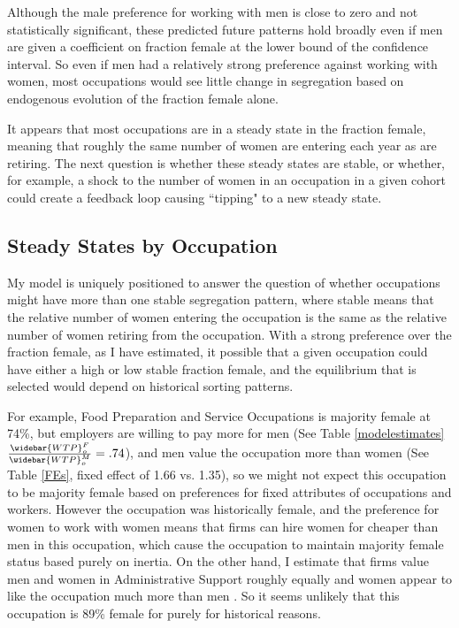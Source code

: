 \documentclass[12pt]{article}
\begin{document}
Although the male preference for working with men is close to zero and not statistically significant, these predicted future patterns hold broadly even if men are given a coefficient on fraction female at the lower bound of the confidence interval. So even if men had a relatively strong preference against working with women, most occupations would see little change in segregation based on endogenous evolution of the fraction female alone.

It appears that most occupations are in a steady state in the fraction female, meaning that roughly the same number of women are entering each year as are retiring. The next question is whether these steady states are stable, or whether, for example, a shock to the number of women in an occupation in a given cohort could create a feedback loop causing ``tipping" to a new steady state.  


\subsection{Steady States by Occupation}
My model is uniquely positioned to answer the question of whether occupations might have more than one stable segregation pattern, where stable means that the relative number of women entering the occupation is the same as the relative number of women retiring from the occupation. With a strong preference over the fraction female, as I have estimated, it possible that a given occupation could have either a high or low stable fraction female, and the equilibrium that is selected would depend on historical sorting patterns. 

For example, Food Preparation and Service Occupations is majority female at 74\%, but employers are willing to pay more for men (See Table \ref{modelestimates} $ \frac{\widebar{WTP}^F_o}{\widebar{WTP}^M_o} = .74$), and men value the occupation more than women (See Table \ref{FEs}, fixed effect of 1.66 vs. 1.35), so we might not expect this occupation to be majority female based on preferences for fixed attributes of occupations and workers. However the occupation was historically female, and the preference for women to work with women means that firms can hire women for cheaper than men in this occupation, which cause the occupation to maintain majority female status based purely on inertia. On the other hand, I estimate that firms value men and women in Administrative Support roughly equally  and women appear to like the occupation much more than men . So it seems unlikely that this occupation is 89\% female for purely for historical reasons. 
\end{document}
